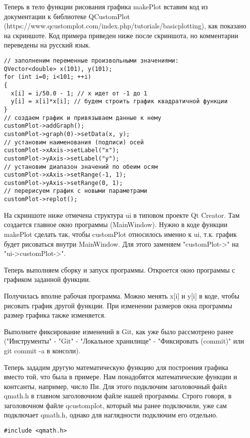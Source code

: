 Теперь в тело функции рисования графика makePlot вставим код из документации к библиотеке QCustomPlot (https://www.qcustomplot.com/index.php/tutorials/basicplotting), как показано на скриншоте. Код примера приведен ниже после скриншота, но комментарии переведены на русский язык.

\begin{verbatim}
// заполненим переменные произвольными значениями:
QVector<double> x(101), y(101);
for (int i=0; i<101; ++i)
{
  x[i] = i/50.0 - 1; // x идет от -1 до 1
  y[i] = x[i]*x[i]; // будем строить график квадратичной функции
}
// создаем график и привязываем данные к нему
customPlot->addGraph();
customPlot->graph(0)->setData(x, y);
// установим наименования (подписи) осей
customPlot->xAxis->setLabel("x");
customPlot->yAxis->setLabel("y");
// установим диапазон значений по обеим осям
customPlot->xAxis->setRange(-1, 1);
customPlot->yAxis->setRange(0, 1);
// перерисуем график с новыми параметрами
customPlot->replot();
\end{verbatim}

На скриншоте ниже отмечена структура ui в типовом проекте Qt Creator. Там создается главное окно программы (MainWindow). Нужно в коде функции makePlot сделать так, чтобы customPlot относилось именно к ui, т.к. график будет рисоваться внутри MainWindow. Для этого заменяем "customPlot->" на "ui->customPlot->".

Теперь выполняем сборку и запуск программы. Откроется окно программы с графиком заданной функции.

Получилась вполне рабочая программа. Можно менять x[i] и y[i] в коде, чтобы рисовать график другой функции. При изменении размеров окна программы размер графика также изменяется.

Выполните фиксирование изменений в Git, как уже было рассмотрено ранее ("Инструменты" - "Git" - "Локальное хранилище" - "Фиксировать (commit)" или git commit -a в консоли).

Теперь зададим другую математическую функцию для построения графика вместо той, что была в примере. Нам понадобятся математические функции и контсанты, например, число Пи. Для этого подключим заголовочный файл qmath.h в главном заголовочном файле нашей программы. Строго говоря, в заголовочном файле qcustomplot, который мы ранее подключили, уже сам подключает qmath.h, однако для наглядности подключим его отдельно.
\begin{verbatim}
#include <qmath.h>
\end{verbatim}

